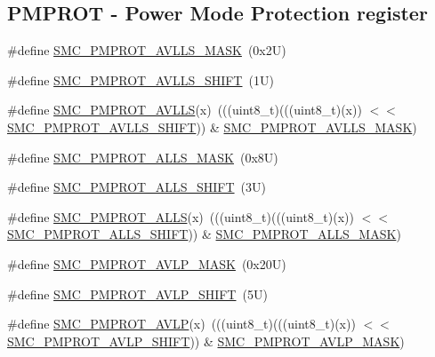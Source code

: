 \subsection*{P\+M\+P\+R\+OT -\/ Power Mode Protection register}
\begin{DoxyCompactItemize}
\item 
\#define \mbox{\hyperlink{group___s_m_c___register___masks_ga62e9f3c7e74a3e5b80b0fae8a896640d}{S\+M\+C\+\_\+\+P\+M\+P\+R\+O\+T\+\_\+\+A\+V\+L\+L\+S\+\_\+\+M\+A\+SK}}~(0x2\+U)
\item 
\#define \mbox{\hyperlink{group___s_m_c___register___masks_gad625b387a627eb3a69f3a26edc0096b8}{S\+M\+C\+\_\+\+P\+M\+P\+R\+O\+T\+\_\+\+A\+V\+L\+L\+S\+\_\+\+S\+H\+I\+FT}}~(1\+U)
\item 
\#define \mbox{\hyperlink{group___s_m_c___register___masks_ga541d218a478588a9ea88a20e32dca00d}{S\+M\+C\+\_\+\+P\+M\+P\+R\+O\+T\+\_\+\+A\+V\+L\+LS}}(x)~(((uint8\+\_\+t)(((uint8\+\_\+t)(x)) $<$$<$ \mbox{\hyperlink{group___s_m_c___register___masks_gad625b387a627eb3a69f3a26edc0096b8}{S\+M\+C\+\_\+\+P\+M\+P\+R\+O\+T\+\_\+\+A\+V\+L\+L\+S\+\_\+\+S\+H\+I\+FT}})) \& \mbox{\hyperlink{group___s_m_c___register___masks_ga62e9f3c7e74a3e5b80b0fae8a896640d}{S\+M\+C\+\_\+\+P\+M\+P\+R\+O\+T\+\_\+\+A\+V\+L\+L\+S\+\_\+\+M\+A\+SK}})
\item 
\#define \mbox{\hyperlink{group___s_m_c___register___masks_ga79d87e312be895d4f2bdfdda8c947600}{S\+M\+C\+\_\+\+P\+M\+P\+R\+O\+T\+\_\+\+A\+L\+L\+S\+\_\+\+M\+A\+SK}}~(0x8\+U)
\item 
\#define \mbox{\hyperlink{group___s_m_c___register___masks_gac6cb1305b9cb329a8bb903036893db11}{S\+M\+C\+\_\+\+P\+M\+P\+R\+O\+T\+\_\+\+A\+L\+L\+S\+\_\+\+S\+H\+I\+FT}}~(3\+U)
\item 
\#define \mbox{\hyperlink{group___s_m_c___register___masks_ga94eb76615367d90d1cd865316a56120d}{S\+M\+C\+\_\+\+P\+M\+P\+R\+O\+T\+\_\+\+A\+L\+LS}}(x)~(((uint8\+\_\+t)(((uint8\+\_\+t)(x)) $<$$<$ \mbox{\hyperlink{group___s_m_c___register___masks_gac6cb1305b9cb329a8bb903036893db11}{S\+M\+C\+\_\+\+P\+M\+P\+R\+O\+T\+\_\+\+A\+L\+L\+S\+\_\+\+S\+H\+I\+FT}})) \& \mbox{\hyperlink{group___s_m_c___register___masks_ga79d87e312be895d4f2bdfdda8c947600}{S\+M\+C\+\_\+\+P\+M\+P\+R\+O\+T\+\_\+\+A\+L\+L\+S\+\_\+\+M\+A\+SK}})
\item 
\#define \mbox{\hyperlink{group___s_m_c___register___masks_ga30602dafb393b5d9c52f0c75e1d78210}{S\+M\+C\+\_\+\+P\+M\+P\+R\+O\+T\+\_\+\+A\+V\+L\+P\+\_\+\+M\+A\+SK}}~(0x20\+U)
\item 
\#define \mbox{\hyperlink{group___s_m_c___register___masks_gae13777e671c1caf2d10809999574fed4}{S\+M\+C\+\_\+\+P\+M\+P\+R\+O\+T\+\_\+\+A\+V\+L\+P\+\_\+\+S\+H\+I\+FT}}~(5\+U)
\item 
\#define \mbox{\hyperlink{group___s_m_c___register___masks_ga9cc7998d16f01dc2d8deb5cd1bf184df}{S\+M\+C\+\_\+\+P\+M\+P\+R\+O\+T\+\_\+\+A\+V\+LP}}(x)~(((uint8\+\_\+t)(((uint8\+\_\+t)(x)) $<$$<$ \mbox{\hyperlink{group___s_m_c___register___masks_gae13777e671c1caf2d10809999574fed4}{S\+M\+C\+\_\+\+P\+M\+P\+R\+O\+T\+\_\+\+A\+V\+L\+P\+\_\+\+S\+H\+I\+FT}})) \& \mbox{\hyperlink{group___s_m_c___register___masks_ga30602dafb393b5d9c52f0c75e1d78210}{S\+M\+C\+\_\+\+P\+M\+P\+R\+O\+T\+\_\+\+A\+V\+L\+P\+\_\+\+M\+A\+SK}})
\end{DoxyCompactItemize}
